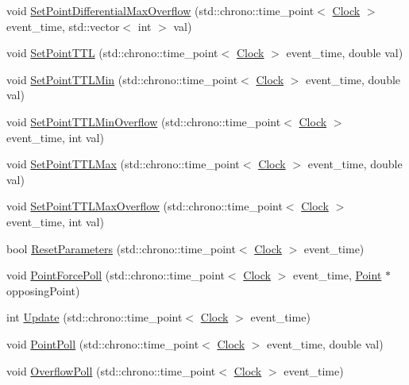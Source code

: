 \begin{DoxyCompactItemize}
\item 
void \mbox{\hyperlink{classPoint_a0b1ce0db9514762fc3aa9d57fa3034a0}{Set\+Point\+Differential\+Max\+Overflow}} (std\+::chrono\+::time\+\_\+point$<$ \mbox{\hyperlink{universe_8h_a0ef8d951d1ca5ab3cfaf7ab4c7a6fd80}{Clock}} $>$ event\+\_\+time, std\+::vector$<$ int $>$ val)
\item 
void \mbox{\hyperlink{classPoint_a60ccff89b647d069146a596b8c43d123}{Set\+Point\+T\+TL}} (std\+::chrono\+::time\+\_\+point$<$ \mbox{\hyperlink{universe_8h_a0ef8d951d1ca5ab3cfaf7ab4c7a6fd80}{Clock}} $>$ event\+\_\+time, double val)
\item 
void \mbox{\hyperlink{classPoint_ae36f75ff4e27742000acd8cad7743614}{Set\+Point\+T\+T\+L\+Min}} (std\+::chrono\+::time\+\_\+point$<$ \mbox{\hyperlink{universe_8h_a0ef8d951d1ca5ab3cfaf7ab4c7a6fd80}{Clock}} $>$ event\+\_\+time, double val)
\item 
void \mbox{\hyperlink{classPoint_a167884648fa6ce217472edfdbf515ac3}{Set\+Point\+T\+T\+L\+Min\+Overflow}} (std\+::chrono\+::time\+\_\+point$<$ \mbox{\hyperlink{universe_8h_a0ef8d951d1ca5ab3cfaf7ab4c7a6fd80}{Clock}} $>$ event\+\_\+time, int val)
\item 
void \mbox{\hyperlink{classPoint_a1227b110f1fa0aab599f9374ea5ec484}{Set\+Point\+T\+T\+L\+Max}} (std\+::chrono\+::time\+\_\+point$<$ \mbox{\hyperlink{universe_8h_a0ef8d951d1ca5ab3cfaf7ab4c7a6fd80}{Clock}} $>$ event\+\_\+time, double val)
\item 
void \mbox{\hyperlink{classPoint_a6a7ca43c551232d5c5d0f5a5d8603c9e}{Set\+Point\+T\+T\+L\+Max\+Overflow}} (std\+::chrono\+::time\+\_\+point$<$ \mbox{\hyperlink{universe_8h_a0ef8d951d1ca5ab3cfaf7ab4c7a6fd80}{Clock}} $>$ event\+\_\+time, int val)
\item 
bool \mbox{\hyperlink{classPoint_a123c78bef71f74d71bc833709a38709c}{Reset\+Parameters}} (std\+::chrono\+::time\+\_\+point$<$ \mbox{\hyperlink{universe_8h_a0ef8d951d1ca5ab3cfaf7ab4c7a6fd80}{Clock}} $>$ event\+\_\+time)
\item 
void \mbox{\hyperlink{classPoint_a414f2215f758cd69fa67e8135ecc4fe2}{Point\+Force\+Poll}} (std\+::chrono\+::time\+\_\+point$<$ \mbox{\hyperlink{universe_8h_a0ef8d951d1ca5ab3cfaf7ab4c7a6fd80}{Clock}} $>$ event\+\_\+time, \mbox{\hyperlink{classPoint}{Point}} $\ast$opposing\+Point)
\item 
int \mbox{\hyperlink{classPoint_a7ad2d1933410012c59bffbd4ac611279}{Update}} (std\+::chrono\+::time\+\_\+point$<$ \mbox{\hyperlink{universe_8h_a0ef8d951d1ca5ab3cfaf7ab4c7a6fd80}{Clock}} $>$ event\+\_\+time)
\item 
void \mbox{\hyperlink{classPoint_a026fcbc22b4667e74fea48a9dc6eeb61}{Point\+Poll}} (std\+::chrono\+::time\+\_\+point$<$ \mbox{\hyperlink{universe_8h_a0ef8d951d1ca5ab3cfaf7ab4c7a6fd80}{Clock}} $>$ event\+\_\+time, double val)
\item 
void \mbox{\hyperlink{classPoint_a44c69c43cfdcb3273d0e6786a21fd000}{Overflow\+Poll}} (std\+::chrono\+::time\+\_\+point$<$ \mbox{\hyperlink{universe_8h_a0ef8d951d1ca5ab3cfaf7ab4c7a6fd80}{Clock}} $>$ event\+\_\+time)
\end{DoxyCompactItemize}
